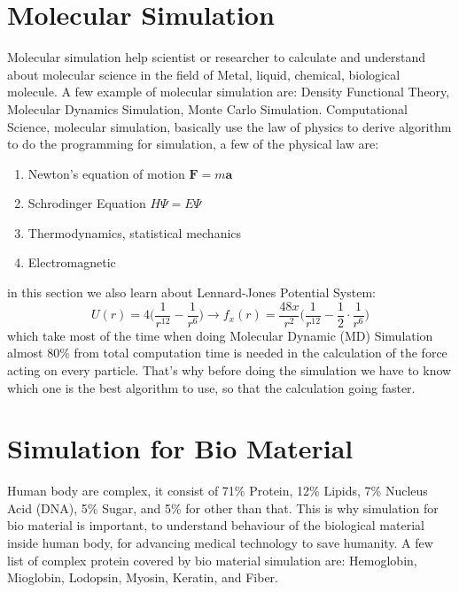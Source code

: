 \documentclass[a4paper,11pt]{article}
\begin{document}
\section{Molecular Simulation}
Molecular simulation help scientist or researcher to calculate and understand about molecular science in the field of Metal, liquid, chemical, biological molecule. A few example of molecular simulation are: Density Functional Theory, Molecular Dynamics Simulation, Monte Carlo Simulation. Computational Science, molecular simulation, basically use the law of physics to derive algorithm to do the programming for simulation, a few of the physical law are:
\begin{enumerate}[label=(\alph*)]
	\item Newton's equation of motion $\textbf{F}=m\textbf{a}$
	\item Schrodinger Equation $H\Psi = E\Psi$
	\item Thermodynamics, statistical mechanics
	\item Electromagnetic
\end{enumerate}
in this section we also learn about Lennard-Jones Potential System:
\begin{equation*}
U(r) = 4\bigg( \frac{1}{r^{12}} - \frac{1}{r^6}\bigg) \rightarrow f_x(r) = \frac{48x}{r^2}\bigg( \frac{1}{r^{12}} - \frac{1}{2} \cdot \frac{1}{r^6} \bigg)
\end{equation*}
which take most of the time when doing Molecular Dynamic (MD) Simulation almost 80\% from total computation time is needed in the calculation of the force acting on every particle. That's why before doing the simulation we have to know which one is the best algorithm to use, so that the calculation going faster.

\section{Simulation for Bio Material}
Human body are complex, it consist of 71\% Protein, 12\% Lipids, 7\% Nucleus Acid (DNA), 5\% Sugar, and 5\% for other than that. This is why simulation for bio material is important, to understand behaviour of the biological material inside human body, for advancing medical technology to save humanity. A few list of complex protein covered by bio material simulation are: Hemoglobin, Mioglobin, Lodopsin, Myosin, Keratin, and Fiber.
\end{document}
